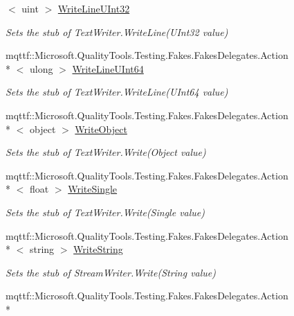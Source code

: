 \begin{DoxyCompactItemize}
$<$ uint $>$ \hyperlink{class_system_1_1_i_o_1_1_fakes_1_1_stub_stream_writer_ae2c9ae5e3dbf0b67f9c981df20b0255e}{Write\-Line\-U\-Int32}
\begin{DoxyCompactList}\small\item\em Sets the stub of Text\-Writer.\-Write\-Line(\-U\-Int32 value)\end{DoxyCompactList}\item 
mqttf\-::\-Microsoft.\-Quality\-Tools.\-Testing.\-Fakes.\-Fakes\-Delegates.\-Action\\*
$<$ ulong $>$ \hyperlink{class_system_1_1_i_o_1_1_fakes_1_1_stub_stream_writer_a5669e1733ab1d73c9c6af78cc3f32caf}{Write\-Line\-U\-Int64}
\begin{DoxyCompactList}\small\item\em Sets the stub of Text\-Writer.\-Write\-Line(\-U\-Int64 value)\end{DoxyCompactList}\item 
mqttf\-::\-Microsoft.\-Quality\-Tools.\-Testing.\-Fakes.\-Fakes\-Delegates.\-Action\\*
$<$ object $>$ \hyperlink{class_system_1_1_i_o_1_1_fakes_1_1_stub_stream_writer_aaf6149f8ab7b37d8dcabfb12544b87cb}{Write\-Object}
\begin{DoxyCompactList}\small\item\em Sets the stub of Text\-Writer.\-Write(\-Object value)\end{DoxyCompactList}\item 
mqttf\-::\-Microsoft.\-Quality\-Tools.\-Testing.\-Fakes.\-Fakes\-Delegates.\-Action\\*
$<$ float $>$ \hyperlink{class_system_1_1_i_o_1_1_fakes_1_1_stub_stream_writer_a961299701726d147742d262974ada80b}{Write\-Single}
\begin{DoxyCompactList}\small\item\em Sets the stub of Text\-Writer.\-Write(\-Single value)\end{DoxyCompactList}\item 
mqttf\-::\-Microsoft.\-Quality\-Tools.\-Testing.\-Fakes.\-Fakes\-Delegates.\-Action\\*
$<$ string $>$ \hyperlink{class_system_1_1_i_o_1_1_fakes_1_1_stub_stream_writer_a3a70f7c25dfa3c74ae49a39bd556af68}{Write\-String}
\begin{DoxyCompactList}\small\item\em Sets the stub of Stream\-Writer.\-Write(\-String value)\end{DoxyCompactList}\item 
mqttf\-::\-Microsoft.\-Quality\-Tools.\-Testing.\-Fakes.\-Fakes\-Delegates.\-Action\\*

\end{DoxyCompactItemize}
